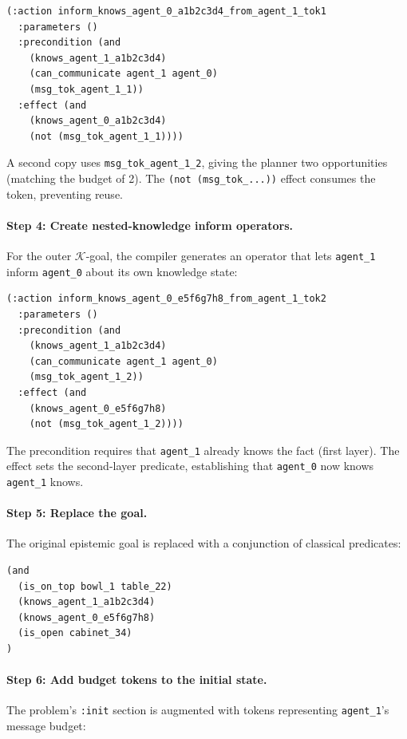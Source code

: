 \documentclass{article} %
\newcommand{\K}{\mathcal{K}}
\begin{document}
\begin{lstlisting}
(:action inform_knows_agent_0_a1b2c3d4_from_agent_1_tok1
  :parameters ()
  :precondition (and
    (knows_agent_1_a1b2c3d4)
    (can_communicate agent_1 agent_0)
    (msg_tok_agent_1_1))
  :effect (and
    (knows_agent_0_a1b2c3d4)
    (not (msg_tok_agent_1_1))))
\end{lstlisting}

A second copy uses \texttt{msg\_tok\_agent\_1\_2}, giving the planner two opportunities (matching the budget of 2). The \texttt{(not (msg\_tok\_...))} effect consumes the token, preventing reuse.

\paragraph{Step 4: Create nested-knowledge inform operators.} For the outer $\K$-goal, the compiler generates an operator that lets \texttt{agent\_1} inform \texttt{agent\_0} about its own knowledge state:

\begin{lstlisting}
(:action inform_knows_agent_0_e5f6g7h8_from_agent_1_tok2
  :parameters ()
  :precondition (and
    (knows_agent_1_a1b2c3d4)
    (can_communicate agent_1 agent_0)
    (msg_tok_agent_1_2))
  :effect (and
    (knows_agent_0_e5f6g7h8)
    (not (msg_tok_agent_1_2))))
\end{lstlisting}

The precondition requires that \texttt{agent\_1} already knows the fact (first layer). The effect sets the second-layer predicate, establishing that \texttt{agent\_0} now knows \texttt{agent\_1} knows.

\paragraph{Step 5: Replace the goal.} The original epistemic goal is replaced with a conjunction of classical predicates:

\begin{lstlisting}
(and
  (is_on_top bowl_1 table_22)
  (knows_agent_1_a1b2c3d4)
  (knows_agent_0_e5f6g7h8)
  (is_open cabinet_34)
)
\end{lstlisting}

\paragraph{Step 6: Add budget tokens to the initial state.} The problem's \texttt{:init} section is augmented with tokens representing \texttt{agent\_1}'s message budget:
\end{document}
